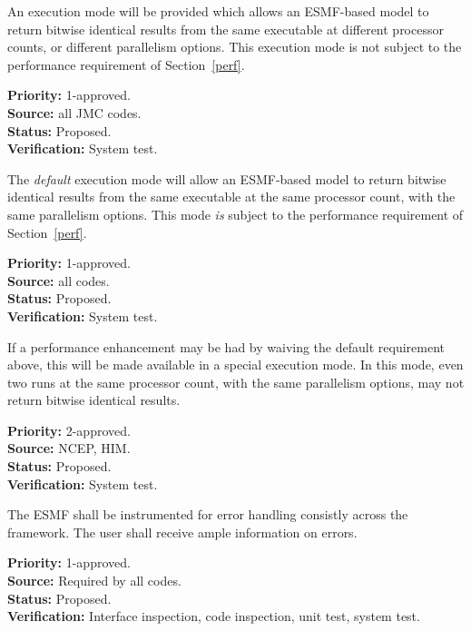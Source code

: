 
An execution mode will be provided which allows an ESMF-based model to
return bitwise identical results from the same executable at different
processor counts, or different parallelism options. This execution
mode is not subject to the performance requirement of Section~\ref{perf}.

\begin{reqlist}
{\bf Priority:} 1-approved. \\
{\bf Source:} all JMC codes. \\
{\bf Status:} Proposed. \\
{\bf Verification:} System test.
\end{reqlist}


The \emph{default} execution mode will allow an ESMF-based model to
return bitwise identical results from the same executable at the same
processor count, with the same parallelism options. This mode
\emph{is} subject to the performance requirement of
Section~\ref{perf}.

\begin{reqlist}
{\bf Priority:} 1-approved. \\
{\bf Source:} all codes. \\
{\bf Status:} Proposed. \\
{\bf Verification:} System test.
\end{reqlist}


If a performance enhancement may be had by waiving the default
requirement above, this will be made available in a special execution
mode. In this mode, even two runs at the same processor count, with
the same parallelism options, may not return bitwise identical
results.

\begin{reqlist}
{\bf Priority:} 2-approved. \\
{\bf Source:} NCEP, HIM. \\
{\bf Status:} Proposed. \\
{\bf Verification:} System test.
\end{reqlist}

The ESMF shall be instrumented for error handling consistly across the
framework.  The user shall receive ample information on errors.
\begin{reqlist}
  {\bf Priority:} 1-approved. \\
  {\bf Source:} Required by all codes. \\
  {\bf Status:} Proposed. \\
  {\bf Verification:} Interface inspection, code inspection, unit
  test, system test.
\end{reqlist}


